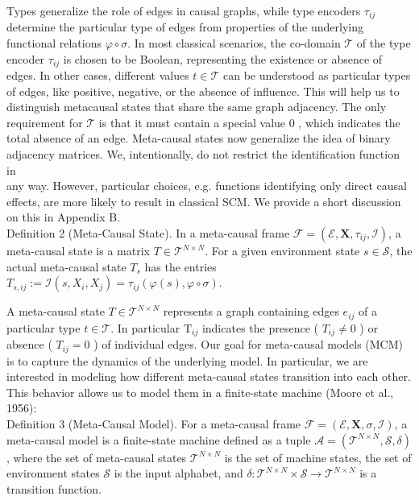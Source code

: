 \documentclass[10pt]{article}
\begin{document}
Types generalize the role of edges in causal graphs, while type encoders $\tau_{i j}$ determine the particular type of edges from properties of the underlying functional relations $\varphi \circ \sigma$. In most classical scenarios, the co-domain $\mathcal{T}$ of the type encoder $\tau_{i j}$ is chosen to be Boolean, representing the existence or absence of edges. In other cases, different values $t \in \mathcal{T}$ can be understood as particular types of edges, like positive, negative, or the absence of influence. This will help us to distinguish metacausal states that share the same graph adjacency. The only requirement for $\mathcal{T}$ is that it must contain a special value 0 , which indicates the total absence of an edge. Meta-causal states now generalize the idea of binary adjacency matrices. We, intentionally, do not restrict the identification function in\\
any way. However, particular choices, e.g. functions identifying only direct causal effects, are more likely to result in classical SCM. We provide a short discussion on this in Appendix B.\\
Definition 2 (Meta-Causal State). In a meta-causal frame $\mathcal{F}=\left(\mathcal{E}, \mathbf{X}, \tau_{i j}, \mathcal{I}\right)$, a meta-causal state is a matrix $T \in \mathcal{T}^{N \times N}$. For a given environment state $s \in \mathcal{S}$, the actual meta-causal state $T_{s}$ has the entries $T_{s, i j}:=\mathcal{I}\left(s, X_{i}, X_{j}\right)=\tau_{i j}(\varphi(s), \varphi \circ \sigma)$.

A meta-causal state $T \in \mathcal{T}^{N \times N}$ represents a graph containing edges $e_{i j}$ of a particular type $t \in \mathcal{T}$. In particular $\mathrm{T}_{i j}$ indicates the presence ( $T_{i j} \neq 0$ ) or absence ( $T_{i j}=0$ ) of individual edges. Our goal for meta-causal models (MCM) is to capture the dynamics of the underlying model. In particular, we are interested in modeling how different meta-causal states transition into each other. This behavior allows us to model them in a finite-state machine (Moore et al., 1956):\\
Definition 3 (Meta-Causal Model). For a meta-causal frame $\mathcal{F}=(\mathcal{E}, \mathbf{X}, \sigma, \mathcal{I})$, a meta-causal model is a finite-state machine defined as a tuple $\mathcal{A}=\left(\mathcal{T}^{N \times N}, \mathcal{S}, \delta\right)$, where the set of meta-causal states $\mathcal{T}^{N \times N}$ is the set of machine states, the set of environment states $\mathcal{S}$ is the input alphabet, and $\delta: \mathcal{T}^{N \times N} \times \mathcal{S} \rightarrow \mathcal{T}^{N \times N}$ is a transition function.
\end{document}
